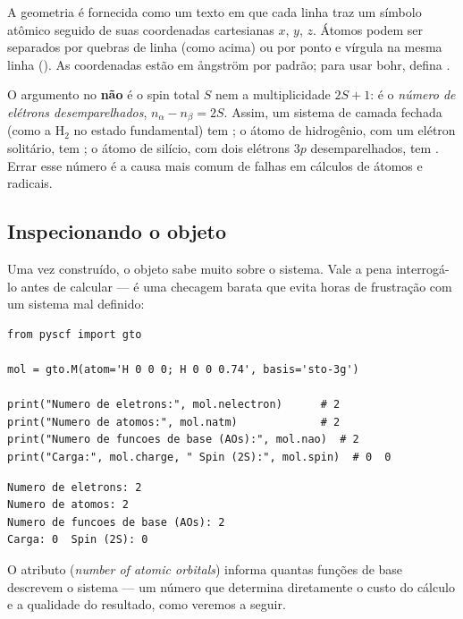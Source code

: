 A geometria é fornecida como um texto em que cada linha traz um símbolo atômico
seguido de suas coordenadas cartesianas $x$, $y$, $z$. Átomos podem ser separados
por quebras de linha (como acima) ou por ponto e vírgula na mesma linha
(). As coordenadas estão em ångström por padrão;
para usar bohr, defina .

\begin{caixaatencao}
O argumento  no \pyscf{} \textbf{não} é o spin total $S$ nem a
multiplicidade $2S+1$: é o \emph{número de elétrons desemparelhados},
$n_\alpha - n_\beta = 2S$. Assim, um sistema de camada fechada (como a H$_2$ no
estado fundamental) tem ; o átomo de hidrogênio, com um elétron
solitário, tem ; o átomo de silício, com dois elétrons $3p$
desemparelhados, tem . Errar esse número é a causa mais comum de
falhas em cálculos de átomos e radicais.
\end{caixaatencao}

\subsection{Inspecionando o objeto }

Uma vez construído, o objeto  sabe muito sobre o sistema. Vale a pena
interrogá-lo antes de calcular --- é uma checagem barata que evita horas de
frustração com um sistema mal definido:

\begin{lstlisting}[style=python,caption={Interrogando o objeto \code{Mole}.},label={lst:moleinspect}]
from pyscf import gto

mol = gto.M(atom='H 0 0 0; H 0 0 0.74', basis='sto-3g')

print("Numero de eletrons:", mol.nelectron)      # 2
print("Numero de atomos:", mol.natm)             # 2
print("Numero de funcoes de base (AOs):", mol.nao)  # 2
print("Carga:", mol.charge, " Spin (2S):", mol.spin)  # 0  0
\end{lstlisting}

\begin{lstlisting}[style=console]
Numero de eletrons: 2
Numero de atomos: 2
Numero de funcoes de base (AOs): 2
Carga: 0  Spin (2S): 0
\end{lstlisting}

\noindent
O atributo  (\emph{number of atomic orbitals}) informa quantas
funções de base descrevem o sistema --- um número que determina diretamente o
custo do cálculo e a qualidade do resultado, como veremos a seguir.


